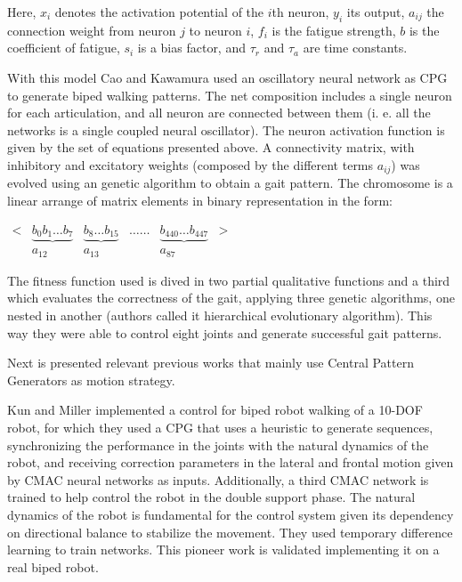 Here, $x_i$ denotes the activation potential of the $i$th neuron,
$y_i$ its output, $a_{ij}$ the connection weight from neuron $j$ to
neuron $i$, $f_i$ is the fatigue strength, $b$ is the coefficient of
fatigue, $s_i$ is a bias factor, and $\tau_r$ and $\tau_a$ are time
constants.


With this model Cao and Kawamura used an oscillatory neural network as
CPG to generate biped walking patterns. The net composition includes a
single neuron for each articulation, and all neuron are connected
between them (i. e. all the networks is a single coupled neural
oscillator). The neuron activation function is given by the set of
equations presented above. A connectivity matrix, with inhibitory and
excitatory weights (composed by the different terms $a_{ij}$) was
evolved using an genetic algorithm to obtain a gait pattern. The
chromosome is a linear arrange of matrix elements in binary
representation in the form:


\begin{center}
  $\begin{array}{cccccc}
    < & \underbrace{b_0b_1\dots b_7} & \underbrace{b_8\dots b_{15}} & \dots\dots & \underbrace{b_{440}\dots b_{447}} & > \\
    & a_{12} & a_{13} & & a_{87} &
  \end{array}$
\end{center}


The fitness function used is dived in two partial qualitative
functions and a third which evaluates the correctness of the gait,
applying three genetic algorithms, one nested in another (authors
called it hierarchical evolutionary algorithm). This way they were
able to control eight joints and generate successful gait patterns.
 

Next is presented relevant previous works that mainly use Central
Pattern Generators as motion strategy.

Kun and Miller \cite{Kun96Adaptive} implemented a control for biped
robot walking of a 10-DOF robot, for which they used a CPG that uses a
heuristic to generate sequences, synchronizing the performance in the
joints with the natural dynamics of the robot, and receiving
correction parameters in the lateral and frontal motion given by CMAC
neural networks as inputs. Additionally, a third CMAC network is
trained to help control the robot in the double support phase. The
natural dynamics of the robot is fundamental for the control system
given its dependency on directional balance to stabilize the
movement. They used temporary difference learning to train
networks. This pioneer work is validated implementing it on a real
biped robot.


